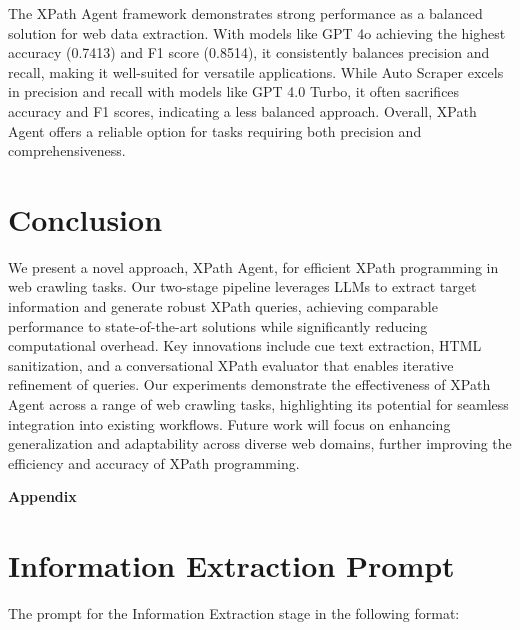 \documentclass[a4paper]{article}
\begin{document}
The XPath Agent framework demonstrates strong performance as a balanced solution for web data extraction. With models like GPT 4o achieving 
the highest accuracy (0.7413) and F1 score (0.8514), it consistently balances precision and recall, making it well-suited for versatile 
applications. While Auto Scraper excels in precision and recall with models like GPT 4.0 Turbo, it often sacrifices accuracy and F1 scores, 
indicating a less balanced approach. Overall, XPath Agent offers a reliable option for tasks requiring both precision and comprehensiveness.

\section{Conclusion}

We present a novel approach, XPath Agent, for efficient XPath programming in web crawling tasks. Our two-stage pipeline leverages LLMs to extract target information and generate robust XPath queries, achieving comparable performance to state-of-the-art solutions while significantly reducing computational overhead. Key innovations include cue text extraction, HTML sanitization, and a conversational XPath evaluator that enables iterative refinement of queries. Our experiments demonstrate the effectiveness of XPath Agent across a range of web crawling tasks, highlighting its potential for seamless integration into existing workflows. Future work will focus on enhancing generalization and adaptability across diverse web domains, further improving the efficiency and accuracy of XPath programming.

\clearpage

\printbibliography

\clearpage
\onecolumn

\appendix

\centerline{\Large\bfseries Appendix}

\section{Information Extraction Prompt}
\label{sec:ie_prompt}

The prompt for the Information Extraction stage in the following format:
\end{document}
